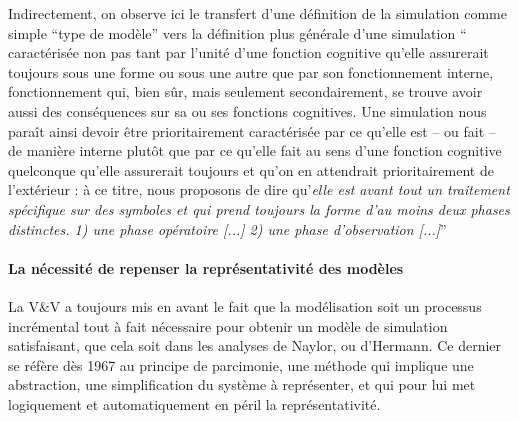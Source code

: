 Indirectement, on observe ici le transfert d'une définition de la simulation comme simple \enquote{type de modèle} vers la définition plus générale d'une simulation \enquote{ caractérisée non pas tant par l’unité d’une fonction cognitive qu’elle assurerait toujours sous une forme ou sous une autre que par son fonctionnement interne, fonctionnement qui, bien sûr, mais seulement secondairement, se trouve avoir aussi des conséquences sur sa ou ses fonctions cognitives. Une simulation nous paraît ainsi devoir être prioritairement caractérisée par ce qu’elle est – ou fait – de manière interne plutôt que par ce qu’elle fait au sens d’une fonction cognitive quelconque qu’elle assurerait toujours et qu’on en attendrait prioritairement de l’extérieur : à ce titre, nous proposons de dire qu’\textit{elle est avant tout un traitement spécifique sur des symboles et qui prend toujours la forme d'au moins deux phases distinctes. 1) une phase opératoire [...] 2) une phase d'observation [...]}} \autocite[33-34]{Varenne2013}

\paragraph{La nécessité de repenser la représentativité des modèles}
\label{p:repenser la representativite}

La V\&V a toujours mis en avant le fait que la modélisation soit un processus incrémental tout à fait nécessaire pour obtenir un modèle de simulation satisfaisant, que cela soit dans les analyses de Naylor, ou d'Hermann. Ce dernier se réfère dès 1967 au principe de parcimonie, une méthode qui implique une abstraction, une simplification du système à représenter, et qui pour lui met logiquement et automatiquement en péril la représentativité.  



